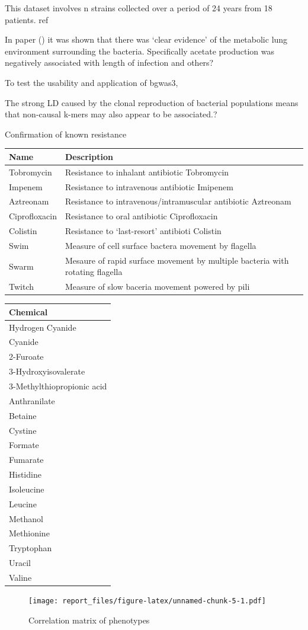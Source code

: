 \documentclass[]{article}
\begin{document}
This dataset involves n strains collected over a period of 24 years from
18 patients. ref

In paper () it was shown that there was `clear evidence' of the
metabolic lung environment surrounding the bacteria. Specifically
acetate production was negatively associated with length of infection
and others?

To test the usability and application of bgwas3,

The strong LD caused by the clonal reproduction of bacterial populations
means that non-causal k-mers may also appear to be associated.?

Confirmation of known resistance

\begin{longtable}[]{@{}ll@{}}
\toprule
Name & Description\tabularnewline
\midrule
\endhead
Tobromycin & Resistance to inhalant antibiotic Tobromycin\tabularnewline
Impenem & Resistance to intravenous antibiotic Imipenem\tabularnewline
Aztreonam & Resistance to intravenous/intramuscular antibiotic
Aztreonam\tabularnewline
Ciprofloxacin & Resistance to oral antibiotic
Ciprofloxacin\tabularnewline
Colistin & Resistance to `last-resort' antibioti Colistin\tabularnewline
Swim & Measure of cell surface bactera movement by
flagella\tabularnewline
Swarm & Mesaure of rapid surface movement by multiple bacteria with
rotating flagella\tabularnewline
Twitch & Measure of slow baceria movement powered by pili\tabularnewline
\bottomrule
\end{longtable}

\begin{longtable}[]{@{}l@{}}
\toprule
Chemical\tabularnewline
\midrule
\endhead
Hydrogen Cyanide\tabularnewline
Cyanide\tabularnewline
2-Furoate\tabularnewline
3-Hydroxyisovalerate\tabularnewline
3-Methylthiopropionic acid\tabularnewline
Anthranilate\tabularnewline
Betaine\tabularnewline
Cystine\tabularnewline
Formate\tabularnewline
Fumarate\tabularnewline
Histidine\tabularnewline
Isoleucine\tabularnewline
Leucine\tabularnewline
Methanol\tabularnewline
Methionine\tabularnewline
Tryptophan\tabularnewline
Uracil\tabularnewline
Valine\tabularnewline
\bottomrule
\end{longtable}

\begin{figure}
\centering
\texttt{[image: report\_files/figure-latex/unnamed-chunk-5-1.pdf]}
\caption{\label{fig:cormat}Correlation matrix of phenotypes}
\end{figure}
\end{document}
